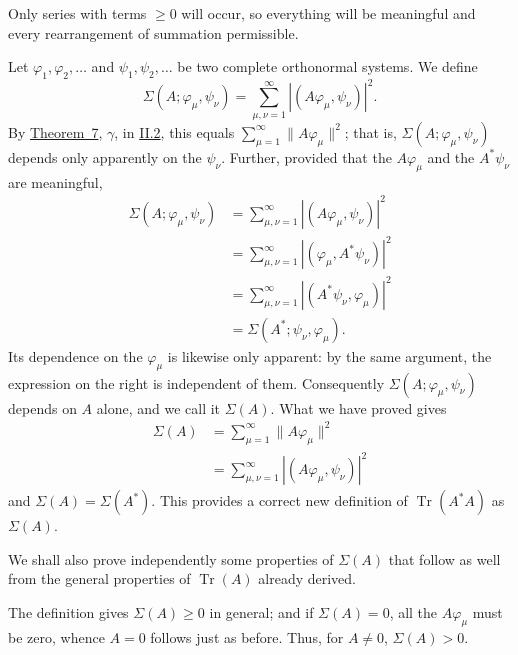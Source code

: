\documentclass[fontsize=13pt,twoside,openany,headings=normal,parskip=false,bookmarkpackage=false,DIV=calc]{scrbook}
\begin{document}
\hypertarget{origpage-96}{}%
Only series with terms $\geq0$ will occur, so everything will be meaningful and every rearrangement of summation permissible.

Let $\varphi_1,\varphi_2,\ldots$ and $\psi_1,\psi_2,\ldots$ be two complete orthonormal systems. We define
\[
\Sigma(A;\varphi_\mu,\psi_\nu)
=\sum_{\mu,\nu=1}^{\infty}|(A\varphi_\mu,\psi_\nu)|^2.
\]
By \hyperref[thm:II.7]{Theorem~7}, $\gamma$, in \hyperref[sec:II.2]{II.2}, this equals $\sum_{\mu=1}^{\infty}\|A\varphi_\mu\|^2$; that is, $\Sigma(A;\varphi_\mu,\psi_\nu)$ depends only apparently on the $\psi_\nu$. Further, provided that the $A\varphi_\mu$ and the $A^*\psi_\nu$ are meaningful,
\begin{align*}
\Sigma(A;\varphi_\mu,\psi_\nu)
&=\sum_{\mu,\nu=1}^{\infty}|(A\varphi_\mu,\psi_\nu)|^2\\
&=\sum_{\mu,\nu=1}^{\infty}|(\varphi_\mu,A^*\psi_\nu)|^2\\
&=\sum_{\mu,\nu=1}^{\infty}|(A^*\psi_\nu,\varphi_\mu)|^2\\
&=\Sigma(A^*;\psi_\nu,\varphi_\mu).
\end{align*}
Its dependence on the $\varphi_\mu$ is likewise only apparent: by the same argument, the expression on the right is independent of them. Consequently $\Sigma(A;\varphi_\mu,\psi_\nu)$ depends on $A$ alone, and we call it $\Sigma(A)$. What we have proved gives
\begin{align*}
\Sigma(A)&=\sum_{\mu=1}^{\infty}\|A\varphi_\mu\|^2\\
&=\sum_{\mu,\nu=1}^{\infty}|(A\varphi_\mu,\psi_\nu)|^2
\end{align*}
and $\Sigma(A)=\Sigma(A^*)$. This provides a correct new definition of $\operatorname{Tr}(A^*A)$ as $\Sigma(A)$.

We shall also prove independently some properties of $\Sigma(A)$ that follow as well from the general properties of $\operatorname{Tr}(A)$ already derived.

The definition gives $\Sigma(A)\geq0$ in general; and if $\Sigma(A)=0$, all the $A\varphi_\mu$ must be zero, whence $A=0$ follows just as before. Thus, for $A\ne0$, $\Sigma(A)>0$.
\end{document}

